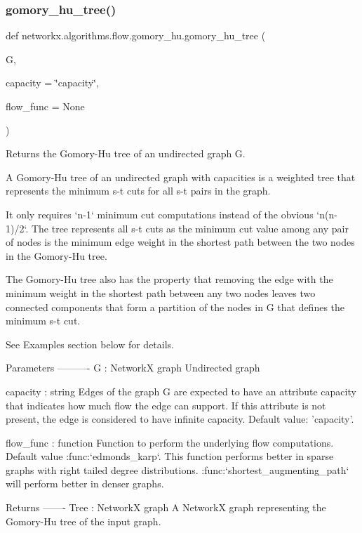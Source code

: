 \subsubsection{\texorpdfstring{gomory\+\_\+hu\+\_\+tree()}{gomory\_hu\_tree()}}
{\footnotesize\ttfamily def networkx.\+algorithms.\+flow.\+gomory\+\_\+hu.\+gomory\+\_\+hu\+\_\+tree (\begin{DoxyParamCaption}\item[{}]{G,  }\item[{}]{capacity = {\ttfamily \char`\"{}capacity\char`\"{}},  }\item[{}]{flow\+\_\+func = {\ttfamily None} }\end{DoxyParamCaption})}

\begin{DoxyVerb}Returns the Gomory-Hu tree of an undirected graph G.

A Gomory-Hu tree of an undirected graph with capacities is a
weighted tree that represents the minimum s-t cuts for all s-t
pairs in the graph.

It only requires `n-1` minimum cut computations instead of the
obvious `n(n-1)/2`. The tree represents all s-t cuts as the
minimum cut value among any pair of nodes is the minimum edge
weight in the shortest path between the two nodes in the
Gomory-Hu tree.

The Gomory-Hu tree also has the property that removing the
edge with the minimum weight in the shortest path between
any two nodes leaves two connected components that form
a partition of the nodes in G that defines the minimum s-t
cut.

See Examples section below for details.

Parameters
----------
G : NetworkX graph
    Undirected graph

capacity : string
    Edges of the graph G are expected to have an attribute capacity
    that indicates how much flow the edge can support. If this
    attribute is not present, the edge is considered to have
    infinite capacity. Default value: 'capacity'.

flow_func : function
    Function to perform the underlying flow computations. Default value
    :func:`edmonds_karp`. This function performs better in sparse graphs
    with right tailed degree distributions.
    :func:`shortest_augmenting_path` will perform better in denser
    graphs.

Returns
-------
Tree : NetworkX graph
    A NetworkX graph representing the Gomory-Hu tree of the input graph.


\end{DoxyVerb}
